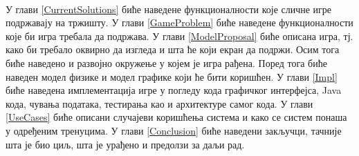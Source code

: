 \\ \indent
У глави \ref{CurrentSolutions} биће наведене функционалности које сличне игре подржавају на тржишту. 
У глави  \ref{GameProblem} биће наведене функционалности које би игра требала да подржава. 
У глави \ref{ModelProposal} биће описана игра, тј. како би требало оквирно да изгледа и шта ће који екран да подржи. Осим тога биће наведено и развојно окружење у којем је игра рађена. Поред тога биће наведен модел физике и модел графике који ће бити коришћен. У глави \ref{Impl} биће наведена имплементација игре у погледу кода графичког интерфејса, Java кода, чувања података, тестирања као и архитектуре самог кода. 
У глави \ref{UseCases} биће описани случајеви коришћења система и како се систем понаша у одређеним тренуцима. У глави \ref{Conclusion} биће наведени закључци, тачније шта је био циљ, шта је урађено и предолзи за даљи рад. 





